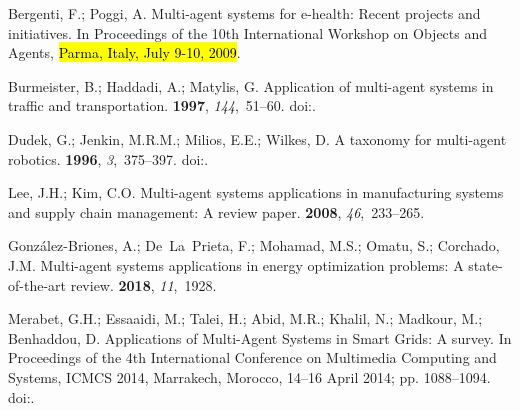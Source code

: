 \documentclass[jsan,article,accept,moreauthors,pdftex]{Definitions/mdpi}
\begin{document}
\begin{thebibliography}{999}
Bergenti, F.; Poggi, A.
\newblock Multi-agent systems for e-health: Recent projects and initiatives.
\newblock   In Proceedings of the 10th International Workshop on Objects and Agents,  \hl{Parma, Italy, July 9-10, 2009}. %


Burmeister, B.; Haddadi, A.; Matylis, G.
\newblock Application of multi-agent systems in traffic and transportation.
 {\bf 1997}, {\em 144},~51--60.
\newblock
  doi:{\href{https://doi.org/10.1049/ip-sen:19971023}{}}.

Dudek, G.; Jenkin, M.R.M.; Milios, E.E.; Wilkes, D.
\newblock A taxonomy for multi-agent robotics.
 {\bf 1996}, {\em 3},~375--397.
\newblock
  doi:{\href{https://doi.org/10.1007/BF00240651}{}}.

Lee, J.H.; Kim, C.O.
\newblock Multi-agent systems applications in manufacturing systems and supply
  chain management: A review paper.
 {\bf 2008}, {\em 46},~233--265.

Gonz{\'a}lez-Briones, A.; De~La~Prieta, F.; Mohamad, M.S.; Omatu, S.; Corchado,
  J.M.
\newblock Multi-agent systems applications in energy optimization problems: A
  state-of-the-art review.
 {\bf 2018}, {\em 11},~1928.

Merabet, G.H.; Essaaidi, M.; Talei, H.; Abid, M.R.; Khalil, N.; Madkour, M.;
  Benhaddou, D.
\newblock Applications of Multi-Agent Systems in Smart Grids: {A} survey.
\newblock   In Proceedings of the 4th International Conference on Multimedia Computing and Systems,
  {ICMCS} 2014, Marrakech, Morocco, 14--16 April 2014; pp.
  1088--1094.
\newblock
  doi:{\href{https://doi.org/10.1109/ICMCS.2014.6911384}{}}.


\end{thebibliography}
\end{document}
